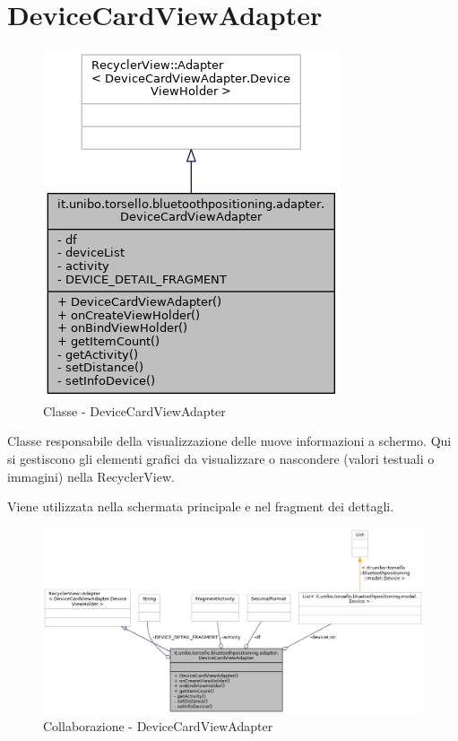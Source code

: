 \newpage
\section{DeviceCardViewAdapter}
\begin{figure}[ph]
	\centering
	\includegraphics[width=0.5\linewidth]{img/uml/class/classit_1_1unibo_1_1torsello_1_1bluetoothpositioning_1_1adapter_1_1DeviceCardViewAdapter__inherit__graph.png}
	\caption{Classe - DeviceCardViewAdapter}
\end{figure}

Classe responsabile della visualizzazione delle nuove informazioni a schermo. Qui si gestiscono gli elementi grafici da visualizzare o nascondere (valori testuali o immagini) nella RecyclerView.

Viene utilizzata nella schermata principale e nel fragment dei dettagli.

\begin{figure}[ph]
	\centering
	\includegraphics[width=1.5\linewidth,angle=90]{img/uml/class/classit_1_1unibo_1_1torsello_1_1bluetoothpositioning_1_1adapter_1_1DeviceCardViewAdapter__coll__graph.png}
	\caption{Collaborazione - DeviceCardViewAdapter}
\end{figure}

